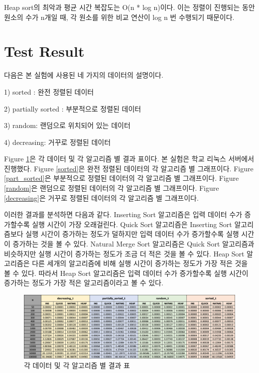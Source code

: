 \documentclass{article}
\begin{document}
Heap sort의 최악과 평균 시간 복잡도는 O(n * log n)이다. 이는 정렬이 진행되는 동안 원소의 수가 n개일 때, 각 원소를 위한 비교 연산이 log n 번 수행되기 때문이다.

\section{Test Result}
다음은 본 실험에 사용된 네 가지의 데이터의 설명이다.

1) sorted : 완전 정렬된 데이터

2) partially sorted : 부분적으로 정렬된 데이터

3) random: 랜덤으로 위치되어 있는 데이터

4) decreasing: 거꾸로 정렬된 데이터

Figure \ref{table}은 각 데이터 및 각 알고리즘 별 결과 표이다. 본 실험은 학교 리눅스 서버에서 진행했다. Figure \ref{sorted}은 완전 정렬된 데이터의 각 알고리즘 별 그래프이다. Figure \ref{part_sorted}은 부분적으로 정렬된 데이터의 각 알고리즘 별 그래프이다. Figure \ref{random}은 랜덤으로 정렬된 데이터의 각 알고리즘 별 그래프이다. Figure \ref{decreasing}은 거꾸로 정렬된 데이터의 각 알고리즘 별 그래프이다. 

이러한 결과를 분석하면 다음과 같다. Inserting Sort 알고리즘은 입력 데이터 수가 증가할수록 실행 시간이 가장 오래걸린다. Quick Sort 알고리즘은 Inserting Sort 알고리즘보다 실행 시간이 증가하는 정도가 덜하지만 입력 데이터 수가 증가할수록 실행 시간이 증가하는 것을 볼 수 있다. Natural Merge Sort 알고리즘은 Quick Sort 알고리즘과 비슷하지만 실행 시간이 증가하는 정도가 조금 더 적은 것을 볼 수 있다. Heap Sort 알고리즘은 다른 세개의 알고리즘에 비해 실행 시간이 증가하는 정도가 가장 적은 것을 볼 수 있다. 따라서 Heap Sort 알고리즘은 입력 데이터 수가 증가할수록 실행 시간이 증가하는 정도가 가장 적은 알고리즘이라고 볼 수 있다.


\begin{figure}
\centering
   \includegraphics[width=13.5cm]{table.jpg}
   \hfil
\caption{각 데이터 및 각 알고리즘 별 결과 표}
\label{table}
\end{figure}
\end{document}
